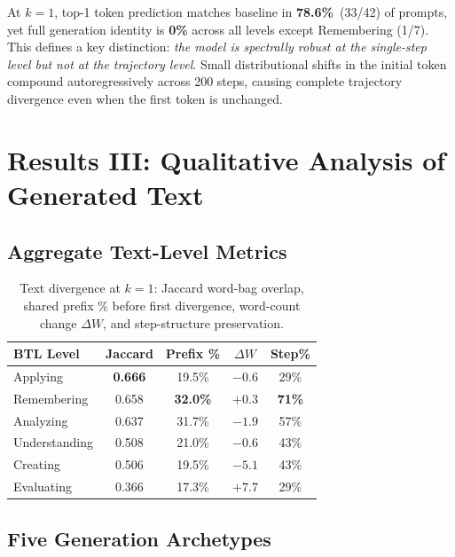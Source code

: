 \documentclass{article}
\begin{document}
At $k=1$, top-1 token prediction matches baseline in \textbf{78.6\%}~(33/42) of
prompts, yet full generation identity is \textbf{0\%} across all levels except
Remembering (1/7).  This defines a key distinction: \emph{the model is spectrally
robust at the single-step level but not at the trajectory level}.  Small distributional
shifts in the initial token compound autoregressively across 200 steps, causing
complete trajectory divergence even when the first token is unchanged.

\section{Results III: Qualitative Analysis of Generated Text}
\label{sec:qualitative}

\subsection{Aggregate Text-Level Metrics}

\begin{table}[h]
\centering
\caption{Text divergence at $k\!=\!1$: Jaccard word-bag overlap,
shared prefix \% before first divergence, word-count change $\Delta W$,
and step-structure preservation.}
\label{tab:text}
\begin{tabular}{lcccc}
\toprule
\textbf{BTL Level} & \textbf{Jaccard} & \textbf{Prefix \%} & \textbf{$\Delta W$} & \textbf{Step\%} \\
\midrule
Applying      & \textbf{0.666} & 19.5\% & $-0.6$ & 29\% \\
Remembering   & 0.658          & \textbf{32.0\%} & $+0.3$ & \textbf{71\%} \\
Analyzing     & 0.637          & 31.7\% & $-1.9$ & 57\%  \\
Understanding & 0.508          & 21.0\% & $-0.6$ & 43\%  \\
Creating      & 0.506          & 19.5\% & $-5.1$ & 43\%  \\
Evaluating    & 0.366          & 17.3\% & $\mathbf{+7.7}$ & 29\%  \\
\bottomrule
\end{tabular}
\end{table}

\subsection{Five Generation Archetypes}
\end{document}
